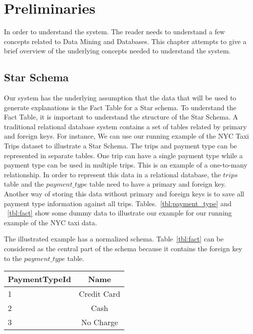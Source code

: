 \chapter{Preliminaries}
\label{chp:prelims}
In order to understand the system. The reader needs to understand a few concepts related to Data Mining and Databases. This chapter attempts to give a brief overview of the underlying concepts needed to understand the system.

\section{Star Schema}
Our system has the underlying assumption that the data that will be used to generate explanations is the Fact Table for a Star schema\citep{giovinazzo2000object,adamson2010star}. To understand the Fact Table, it is important to understand the structure of the Star Schema. A traditional relational database system contains a set of tables related by primary and foreign keys. For instance, We can use our running example of the NYC Taxi Trips dataset to illustrate a Star Schema. The trips and payment type can be represented in separate tables. One trip can have a single payment type while a payment type can be used in multiple trips. This is an example of a one-to-many relationship.
In order to represent this data in a relational database, the $trips$ table and the $payment\_type$ table need to have a primary and foreign key. Another way of storing this data without primary and foreign keys is to save all payment type information against all trips. Tables.~\ref{tbl:payment_type} and ~\ref{tbl:fact} show some dummy data to illustrate our example for our running example of the NYC taxi data.

The illustrated example has a normalized schema\citep{beeri1988sophisticate}. Table~\ref{tbl:fact} can be considered as the central part of the schema because it contains the foreign key to the $payment\_type$ table.



\begin{center}
  \begin{tabular}{ | l | c | }
    \hline
    \textbf{PaymentTypeId} & \textbf{Name} \\ \hline
    1 & Credit Card  \\ \hline
    2 & Cash  \\ \hline
    3 & No Charge  \\
    \hline
  \end{tabular}
\end{center}
\label{tbl:payment_type}

